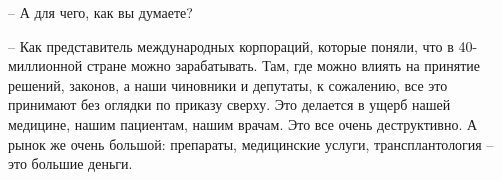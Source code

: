 – А для чего, как вы думаете?

– Как представитель международных корпораций, которые поняли, что в
40-миллионной стране можно зарабатывать. Там, где можно влиять на принятие
решений, законов, а наши чиновники и депутаты, к сожалению, все это принимают
без оглядки по приказу сверху. Это делается в ущерб нашей медицине, нашим
пациентам, нашим врачам. Это все очень деструктивно. А рынок же очень большой:
препараты, медицинские услуги, трансплантология – это большие деньги. 
